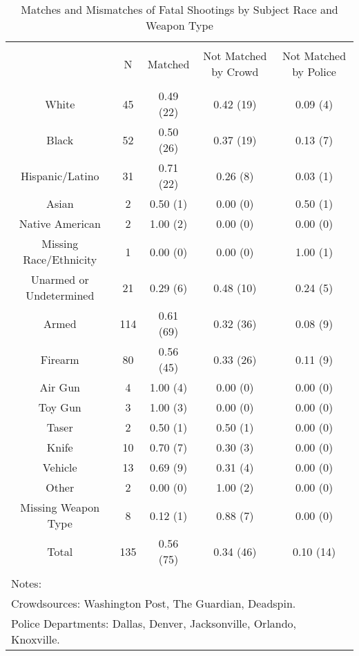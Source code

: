 
\begin{table}[!htbp] \centering 
  \caption{Matches and Mismatches of Fatal Shootings by Subject Race and Weapon Type} 
  \label{} 
\footnotesize 
\begin{tabular}{@{\extracolsep{5pt}} ccccc} 
\\[-1.8ex]\hline 
\hline \\[-1.8ex] 
 & N & Matched & Not Matched by Crowd & Not Matched by Police \\ 
\hline \\[-1.8ex] 
White & 45 & 0.49 (22) & 0.42 (19) & 0.09 (4) \\ 
Black & 52 & 0.50 (26) & 0.37 (19) & 0.13 (7) \\ 
Hispanic/Latino & 31 & 0.71 (22) & 0.26 (8) & 0.03 (1) \\ 
Asian & 2 & 0.50 (1) & 0.00 (0) & 0.50 (1) \\ 
Native American & 2 & 1.00 (2) & 0.00 (0) & 0.00 (0) \\ 
Missing Race/Ethnicity & 1 & 0.00 (0) & 0.00 (0) & 1.00 (1) \\ 
Unarmed or Undetermined & 21 & 0.29 (6) & 0.48 (10) & 0.24 (5) \\ 
Armed & 114 & 0.61 (69) & 0.32 (36) & 0.08 (9) \\ 
Firearm & 80 & 0.56 (45) & 0.33 (26) & 0.11 (9) \\ 
Air Gun & 4 & 1.00 (4) & 0.00 (0) & 0.00 (0) \\ 
Toy Gun & 3 & 1.00 (3) & 0.00 (0) & 0.00 (0) \\ 
Taser & 2 & 0.50 (1) & 0.50 (1) & 0.00 (0) \\ 
Knife & 10 & 0.70 (7) & 0.30 (3) & 0.00 (0) \\ 
Vehicle & 13 & 0.69 (9) & 0.31 (4) & 0.00 (0) \\ 
Other & 2 & 0.00 (0) & 1.00 (2) & 0.00 (0) \\ 
Missing Weapon Type & 8 & 0.12 (1) & 0.88 (7) & 0.00 (0) \\ 
Total & 135 & 0.56 (75) & 0.34 (46) & 0.10 (14) \\ 
\hline \\[-1.8ex] 
\multicolumn{5}{l}{Notes:} \\ 
\multicolumn{5}{l}{Crowdsources: Washington Post, The Guardian, Deadspin.} \\ 
\multicolumn{5}{l}{Police Departments: Dallas, Denver, Jacksonville, Orlando, Knoxville.} \\ 
\end{tabular} 
\end{table}  
